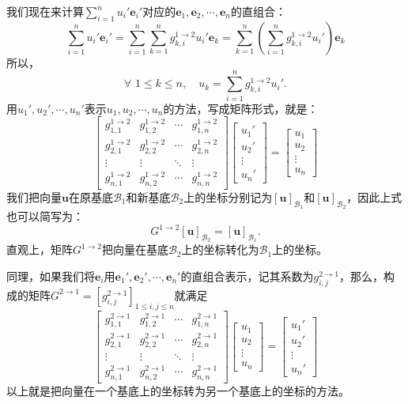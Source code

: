 \documentclass[12pt,UTF8,fontset=none]{ctexbook}
\begin{document}
我们现在来计算$\sum_{i=1}^n u_i'\mathbf{e}_i' $对应的$\mathbf{e}_1, \mathbf{e}_2, \cdots, \mathbf{e}_n$的直组合：
$$\sum_{i=1}^n u_i'\mathbf{e}_i' = \sum_{i=1}^n \sum_{k=1}^n g_{k,i}^{1\rightarrow 2} u_i' \mathbf{e}_k = \sum_{k=1}^n \left(\sum_{i=1}^n g_{k,i}^{1\rightarrow 2} u_i'\right) \mathbf{e}_k$$
所以，
$$\forall \,\, 1 \leqslant k \leqslant n, \quad u_k = \sum_{i=1}^n g_{k,i}^{1\rightarrow 2} u_i'.$$
用$u_1', u_2', \cdots, u_n'$表示$u_1, u_2, \cdots, u_n$的方法，写成矩阵形式，就是：
$$\begin{bmatrix}g_{1,1}^{1\rightarrow 2} & g_{1,2}^{1\rightarrow 2} & \cdots & g_{1,n}^{1\rightarrow 2} \\ g_{2,1}^{1\rightarrow 2} & g_{2,2}^{1\rightarrow 2} & \cdots & g_{2,n}^{1\rightarrow 2}\\ \vdots & \vdots & \ddots & \vdots \\ g_{n,1}^{1\rightarrow 2} & g_{n,2}^{1\rightarrow 2} & \cdots & g_{n,n}^{1\rightarrow 2}\end{bmatrix} \begin{bmatrix}u_1' \\ u_2'\\ \vdots\\ u_n'\end{bmatrix} = \begin{bmatrix}u_1 \\ u_2\\ \vdots\\ u_n\end{bmatrix}$$
我们把向量$\mathbf{u}$在原基底$\mathcal{B}_1$和新基底$\mathcal{B}_2$上的坐标分别记为$[\mathbf{u}]_{\mathcal{B}_1}$和$[\mathbf{u}]_{\mathcal{B}_2}$，因此上式也可以简写为：
$$ G^{1\rightarrow 2} [\mathbf{u}]_{\mathcal{B}_2} = [\mathbf{u}]_{\mathcal{B}_1}. $$
直观上，矩阵$G^{1\rightarrow 2}$把向量在基底$\mathcal{B}_2$上的坐标转化为$\mathcal{B}_1$上的坐标。

同理，如果我们将$\mathbf{e}_i$用$\mathbf{e}_1', \mathbf{e}_2', \cdots, \mathbf{e}_n'$的直组合表示，记其系数为$g_{i,j}^{2\rightarrow 1}$，那么，构成的矩阵$G^{2\rightarrow 1} = \left[g_{i,j}^{2\rightarrow 1}\right]_{1\leqslant i , j \leqslant n}$就满足
$$\begin{bmatrix}g_{1,1}^{2\rightarrow 1} & g_{1,2}^{2\rightarrow 1} & \cdots & g_{1,n}^{2\rightarrow 1} \\ g_{2,1}^{2\rightarrow 1} & g_{2,2}^{2\rightarrow 1} & \cdots & g_{2,n}^{2\rightarrow 1}\\ \vdots & \vdots & \ddots & \vdots \\ g_{n,1}^{2\rightarrow 1} & g_{n,2}^{2\rightarrow 1} & \cdots & g_{n,n}^{2\rightarrow 1}\end{bmatrix} \begin{bmatrix}u_1 \\ u_2\\ \vdots\\ u_n\end{bmatrix} = \begin{bmatrix}u_1' \\ u_2'\\ \vdots\\ u_n'\end{bmatrix}$$
以上就是把向量在一个基底上的坐标转为另一个基底上的坐标的方法。
\end{document}
